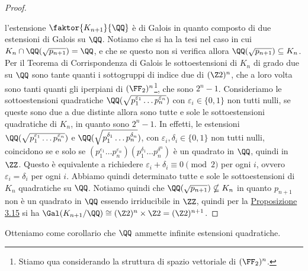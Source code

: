 \documentclass[11pt]{scrartcl}
\begin{document}
\begin{proof}
\begin{center}
		\end{center}
		l'estensione $\faktor{K_{n + 1}}{\QQ}$ è di Galois in quanto composto
		di due estensioni di Galois su $\QQ$. Notiamo che si ha la tesi nel caso 
		in cui $K_n \cap \QQ(\sqrt{p_{n + 1}}) = \QQ$, e che se questo non si 
		verifica allora $\QQ(\sqrt{p_{n + 1}}) \subseteq K_n$. Per il Teorema di 
		Corrispondenza di Galois le sottoestensioni di $K_n$ di grado due su 
		$\QQ$ sono tante quanti i sottogruppi di indice due di $(\Z2)^n$, che a 
		loro volta sono tanti quanti gli iperpiani di $(\FF_2)^n$\footnote{
			Stiamo qua considerando la struttura di spazio vettoriale di $(\FF_2)^n$.
		}, che sono $2^n - 1$.
		Consideriamo le sottoestensioni quadratiche 
		$\QQ(\sqrt{p_1^{\varepsilon_1}\ldots p_n^{\varepsilon_n}})$ con $\varepsilon_i \in \{0, 1\}$
		non tutti nulli, se queste sono due a due distinte allora sono tutte e sole
		le sottoestensioni quadratiche di $K_n$, in quanto sono $2^n - 1$. In effetti,
		le estensioni $\QQ(\sqrt{p_1^{\varepsilon_1}\ldots p_n^{\varepsilon_n}})$ e
		$\QQ(\sqrt{p_1^{\delta_1}\ldots p_n^{\delta_n}})$, con 
		$\varepsilon_i, \delta_i \in \{0, 1\}$ non tutti nulli, coincidono se e solo se 
		$(p_1^{\varepsilon_1}\ldots p_n^{\varepsilon_n})(p_1^{\delta_1}\ldots p_n^{\delta^n})$
		è un quadrato in $\QQ$, quindi in $\ZZ$. Questo è equivalente a richiedere
		$\varepsilon_i + \delta_i \equiv 0 \pmod 2$ per ogni $i$, ovvero 
		$\varepsilon_i = \delta_i$ per ogni $i$. Abbiamo quindi determinato tutte 
		e sole le sottoestensioni di $K_n$ quadratiche su $\QQ$. Notiamo quindi 
		che $\QQ(\sqrt{p_{n + 1}}) \nsubseteq K_n$ in quanto $p_{n + 1}$ non è 
		un quadrato in $\QQ$ essendo irriducibile in $\ZZ$, quindi per la 
		\hyperref[prop3.15]{Proposizione 3.15} si ha $\Gal(K_{n + 1}/\QQ) \cong
		(\Z2)^n\times \Z2 = (\Z2)^{n + 1}$.
	\end{proof}
	
	\begin{remark}
		Otteniamo come corollario che $\QQ$ ammette infinite estensioni quadratiche.
	\end{remark}
	
\end{document}
